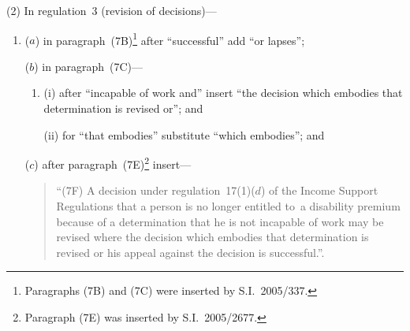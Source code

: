 \documentclass[12pt,a4paper]{article}
\begin{document}
(2) In regulation~3 (revision of decisions)—
\begin{enumerate}\item[]
($a$) in paragraph~(7B)\footnote{Paragraphs (7B) and (7C) were inserted by S.I.~2005/337.} after “successful” add “or lapses”;

($b$) in paragraph~(7C)—
\begin{enumerate}\item[]
(i) after “incapable of work and” insert “the decision which embodies that determination is revised or”; and

(ii) for “that embodies” substitute “which embodies”; and
\end{enumerate}

($c$) after paragraph~(7E)\footnote{Paragraph (7E) was inserted by S.I.~2005/2677.} insert—
\begin{quotation}
“(7F) A decision under regulation~17(1)($d$)  of the Income Support Regulations that a person is no longer entitled to~a disability premium because of a determination that he is not incapable of work may be revised where the decision which embodies that determination is revised or his appeal against the decision is successful.”.
\end{quotation}
\end{enumerate}
\end{document}
